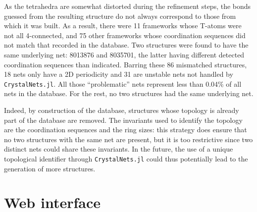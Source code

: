 \documentclass[main.tex]{subfiles}
\begin{document}
As the  tetrahedra are somewhat distorted during the refinement steps, the bonds guessed from the resulting structure do not always correspond to those from which it was built. As a result, there were 11 frameworks whose T-atoms were not all 4-connected, and 75 other frameworks whose coordination sequences did not match that recorded in the database. Two structures were found to have the same underlying net: 8013876 and 8035701, the latter having different detected coordination sequences than indicated.
Barring these 86 mismatched structures, 18 nets only have a 2D periodicity and 31 are unstable nets not handled by \texttt{CrystalNets.jl}. All those ``problematic'' nets represent less than 0.04\% of all nets in the database. For the rest, no two structures had the same underlying net.

Indeed, by construction of the database, structures whose topology is already part of the database are removed. The invariants used to identify the topology are the coordination sequences and the ring sizes: this strategy does ensure that no two structures with the same net are present, but it is too restrictive since two distinct nets could share these invariants. In the future, the use of a unique topological identifier through \texttt{CrystalNets.jl} could thus potentially lead to the generation of more structures.

\section{Web interface}
\label{webcrystalnets}
\end{document}
